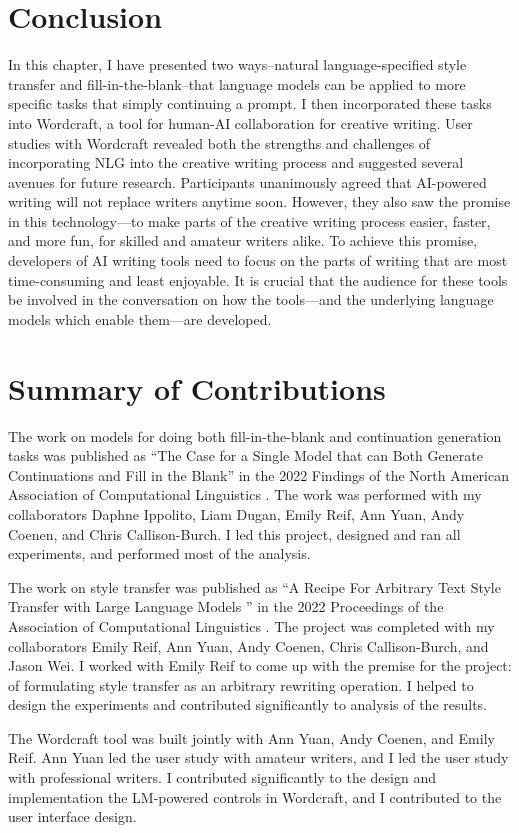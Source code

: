 \section{Conclusion}
In this chapter, I have presented two ways--natural language-specified style transfer and fill-in-the-blank--that language models can be applied to more specific tasks that simply continuing a prompt.
I then incorporated these tasks into Wordcraft, a tool for human-AI collaboration for creative writing.
User studies with Wordcraft revealed both the strengths and challenges of incorporating NLG into the creative writing process and suggested several avenues for future research.
Participants unanimously agreed that AI-powered writing will not
replace writers anytime soon.
However, they also saw the promise in this technology---to make parts of the creative writing process easier, faster, and more fun, for skilled and amateur writers alike.
To achieve this promise, developers of AI writing tools need to focus on the parts of writing that are
most time-consuming and least enjoyable.
It is crucial that the audience for these tools be involved in the conversation on how the tools---and the underlying language models which enable them---are developed.


\section{Summary of Contributions}
The work on models for doing both fill-in-the-blank and continuation generation tasks was published as ``The Case for a Single Model that can Both Generate Continuations and Fill in the Blank'' in the 2022 Findings of the North American Association of Computational Linguistics \citep{fitb_fite}.
The work was performed with my collaborators Daphne Ippolito, Liam Dugan, Emily Reif, Ann Yuan, Andy Coenen, and Chris Callison-Burch.
I led this project, designed and ran all experiments, and performed most of the analysis.

The work on style transfer was published as ``A Recipe For Arbitrary Text Style Transfer with Large Language Models
'' in the 2022 Proceedings of the Association of Computational Linguistics \citep{reif2021recipe}.
The project was completed with my collaborators Emily Reif, Ann Yuan, Andy Coenen, Chris Callison-Burch, and Jason Wei.
I worked with Emily Reif to come up with the premise for the project: of formulating style transfer as an arbitrary rewriting operation.
I helped to design the experiments and contributed significantly to analysis of the results.

The Wordcraft tool was built jointly with Ann Yuan, Andy Coenen, and Emily Reif.
Ann Yuan led the user study with amateur writers, and I led the user study with professional writers.
I contributed significantly to the design and implementation the LM-powered controls in Wordcraft, and I contributed to the user interface design.